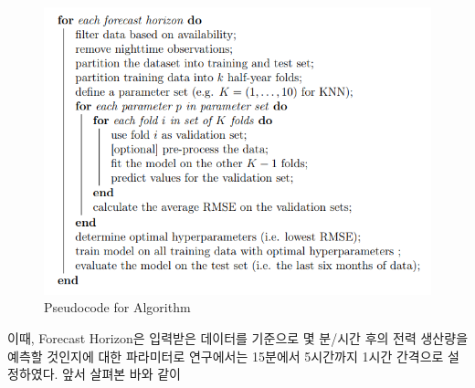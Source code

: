 \documentclass{article}
\begin{document}
\begin{figure}[h]
\centering
\includegraphics[scale=0.70]{./fig/Figure_5.png}
\caption{Pseudocode for Algorithm}
\label{fig_4}
\end{figure}

이때, Forecast Horizon은 입력받은 데이터를 기준으로 몇 분/시간 후의 전력 생산량을 예측할 것인지에 대한 파라미터로 연구에서는 15분에서 5시간까지 1시간 간격으로 설정하였다. 앞서 살펴본 바와 같이
\end{document}
